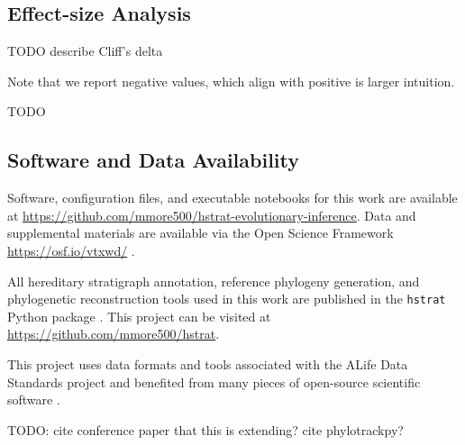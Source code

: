 \subsection{Effect-size Analysis}

TODO describe Cliff's delta
\citep{meissel2024using}

Note that we report negative values, which align with positive is larger intuition.

TODO \citep{mann1947on}

\subsection{Software and Data Availability}

Software, configuration files, and executable notebooks for this work are available at \url{https://github.com/mmore500/hstrat-evolutionary-inference}.
Data and supplemental materials are available via the Open Science Framework \url{https://osf.io/vtxwd/} \citep{foster2017open}.

All hereditary stratigraph annotation, reference phylogeny generation, and phylogenetic reconstruction tools used in this work are published in the \texttt{hstrat} Python package \citep{moreno2022hstrat}.
This project can be visited at \url{https://github.com/mmore500/hstrat}.

This project uses data formats and tools associated with the ALife Data Standards project \citep{lalejini2019data} and benefited from many pieces of open-source scientific software \citep{ofria2020empirical,sand2014tqdist,2020SciPy-NMeth,harris2020array,reback2020pandas,mckinney-proc-scipy-2010,sukumaran2010dendropy,cock2009biopython,torchiano2016effsize,waskom2021seaborn,hunter2007matplotlib,moreno2024apc,moreno2024qspool,moreno2023teeplot,hagen2021gen3sis,ofria2004avida,torchiano2016effsize}.

TODO: cite conference paper that this is extending? cite phylotrackpy?

